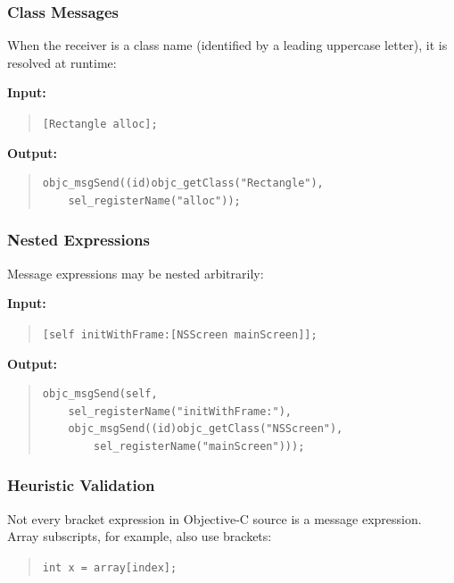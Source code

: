 \documentclass[11pt,twoside]{article}
\begin{document}
\subsubsection{Class Messages}

When the receiver is a class name (identified by a leading uppercase
letter), it is resolved at runtime:

{\bf Input:}
\begin{quote}
{\tt [Rectangle alloc];}
\end{quote}

{\bf Output:}
\begin{quote}
\begin{verbatim}
objc_msgSend((id)objc_getClass("Rectangle"),
    sel_registerName("alloc"));
\end{verbatim}
\end{quote}

\subsubsection{Nested Expressions}

Message expressions may be nested arbitrarily:

{\bf Input:}
\begin{quote}
{\tt [self initWithFrame:[NSScreen mainScreen]];}
\end{quote}

{\bf Output:}
\begin{quote}
\begin{verbatim}
objc_msgSend(self,
    sel_registerName("initWithFrame:"),
    objc_msgSend((id)objc_getClass("NSScreen"),
        sel_registerName("mainScreen")));
\end{verbatim}
\end{quote}

\subsubsection{Heuristic Validation}

Not every bracket expression in Objective-C source is a message
expression.  Array subscripts, for example, also use brackets:
\begin{quote}
{\tt int x = array[index];}
\end{quote}
\end{document}
